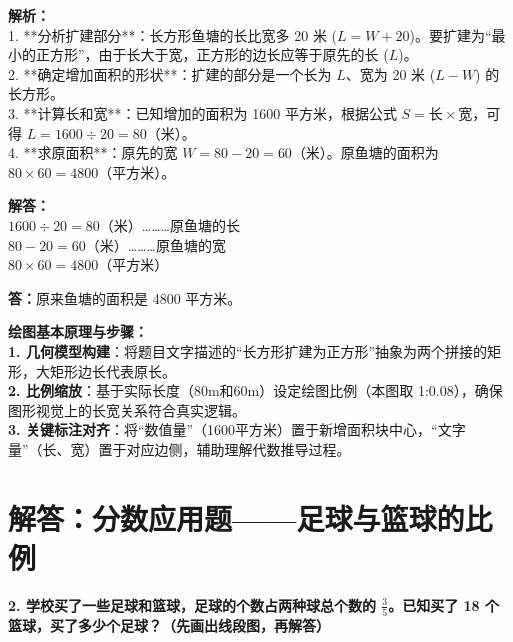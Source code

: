 \vspace{0.6cm}

{\small\color{gray}
\textbf{解析：}\\
1. **分析扩建部分**：长方形鱼塘的长比宽多 20 米 ($L = W + 20$)。要扩建为“最小的正方形”，由于长大于宽，正方形的边长应等于原先的长 ($L$)。\\
2. **确定增加面积的形状**：扩建的部分是一个长为 $L$、宽为 20 米 ($L - W$) 的长方形。\\
3. **计算长和宽**：已知增加的面积为 1600 平方米，根据公式 $S = \text{长} \times \text{宽}$，可得 $L = 1600 \div 20 = 80$（米）。\\
4. **求原面积**：原先的宽 $W = 80 - 20 = 60$（米）。原鱼塘的面积为 $80 \times 60 = 4800$（平方米）。
}

\vspace{0.4cm}
\noindent\textbf{解答：}\\
\indent $1600 \div 20 = 80$（米）\dots\dots\dots 原鱼塘的长\\
\indent $80 - 20 = 60$（米）\dots\dots\dots 原鱼塘的宽\\
\indent $80 \times 60 = 4800$（平方米）

\vspace{0.2cm}
\noindent\textbf{答：}原来鱼塘的面积是 4800 平方米。

\vspace{0.6cm}

{\small\color{blue!70!black}
\textbf{绘图基本原理与步骤：}\\
\textbf{1. 几何模型构建}：将题目文字描述的“长方形扩建为正方形”抽象为两个拼接的矩形，大矩形边长代表原长。\\
\textbf{2. 比例缩放}：基于实际长度（80m和60m）设定绘图比例（本图取 1:0.08），确保图形视觉上的长宽关系符合真实逻辑。\\
\textbf{3. 关键标注对齐}：将“数值量”（1600平方米）置于新增面积块中心，“文字量”（长、宽）置于对应边侧，辅助理解代数推导过程。
}


\newpage




\newpage

\section{解答：分数应用题——足球与篮球的比例}

\vspace{0.4cm}

\noindent\textbf{2. 学校买了一些足球和篮球，足球的个数占两种球总个数的 $\frac{3}{5}$。已知买了 18 个篮球，买了多少个足球？（先画出线段图，再解答）}

